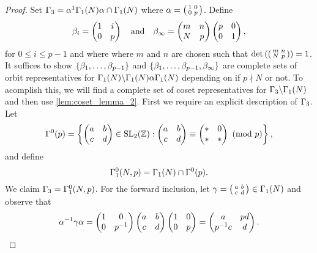       \begin{proof}
        Set $\Gamma_{3} = \alpha^{1}\Gamma_{1}(N)\alpha \cap \Gamma_{1}(N)$ where $\alpha = \begin{psmallmatrix} 1 & 0 \\ 0 & p \end{psmallmatrix}$. Define
        \[
          \beta_{i} = \begin{pmatrix} 1 & i \\ 0 & p \end{pmatrix} \quad \text{and} \quad \beta_{\infty} = \begin{pmatrix} m & n \\ N & p \end{pmatrix}\begin{pmatrix} p & 0 \\ 0 & 1 \end{pmatrix},
        \]
        for $0 \le i \le p-1$ and where where $m$ and $n$ are chosen such that $\det\left(\begin{psmallmatrix} m & n \\ N & p \end{psmallmatrix}\right) = 1$. It suffices to show $\{\beta_{1},\ldots,\beta_{p-1}\}$ and $\{\beta_{1},\ldots,\beta_{p-1},\beta_{\infty}\}$ are complete sets of orbit representatives for $\Gamma_{1}(N)\backslash\Gamma_{1}(N)\alpha\Gamma_{1}(N)$ depending on if $p \nmid N$ or not. To acomplish this, we will find a complete set of coset representatives for $\Gamma_{3}\backslash\Gamma_{1}(N)$ and then use \cref{lem:coset_lemma_2}. First we require an explicit description of $\Gamma_{3}$. Let
        \[
          \Gamma^{0}(p) = \left\{\begin{pmatrix} a & b \\ c & d \end{pmatrix} \in \mathrm{SL}_{2}(\mathbb{Z}):\begin{pmatrix} a & b \\ c & d \end{pmatrix} \equiv \begin{pmatrix} \ast & 0 \\ \ast & \ast \end{pmatrix} \ \left(\text{mod }p\right)\right\},
        \]
        and define
        \[
          \Gamma_{1}^{0}(N,p) = \Gamma_{1}(N) \cap \Gamma^{0}(p).
        \]
        We claim $\Gamma_{3} = \Gamma_{1}^{0}(N,p)$. For the forward inclusion, let $\gamma = \begin{psmallmatrix} a & b \\ c & d \end{psmallmatrix} \in \Gamma_{1}(N)$ and observe that
        \[
          \alpha^{-1}\gamma\alpha = \begin{pmatrix} 1 & 0 \\ 0 & p^{-1} \end{pmatrix}\begin{pmatrix} a & b \\ c & d \end{pmatrix}\begin{pmatrix} 1 & 0 \\ 0 & p \end{pmatrix} = \begin{pmatrix} a & pd \\ p^{-1}c & d \end{pmatrix}.
\]
\end{proof}
